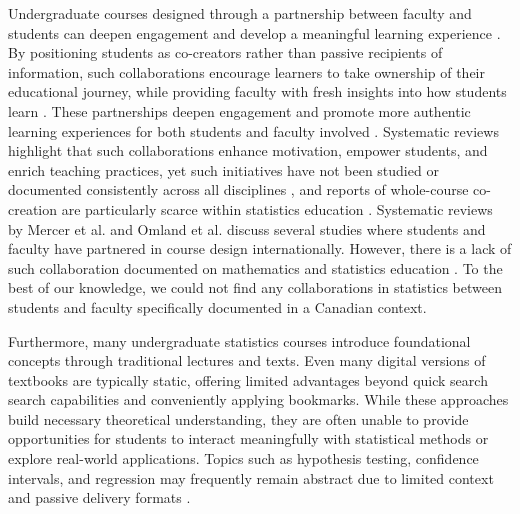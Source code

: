 \documentclass[11pt]{article}
\begin{document}
Undergraduate courses designed through a partnership between faculty and students can deepen engagement and develop a meaningful learning experience \cite{Healey2016} \cite{Bovill2019}. 
By positioning students as co-creators rather than passive recipients of information, such collaborations encourage learners to take ownership of their educational journey, while providing faculty with fresh insights into how students learn \cite{Healey2016}.
These partnerships deepen engagement and promote more authentic learning experiences for both students and faculty involved \cite{Bengtson2013} \cite{Healey2016}.
Systematic reviews highlight that such collaborations enhance motivation, empower students, and enrich teaching practices, yet such initiatives have not been studied or documented consistently across all disciplines \cite{Bovill2019} \cite{MercerMapstone2017}, and reports of whole-course co-creation are particularly scarce within statistics education \cite{Kim2022}. 
Systematic reviews by Mercer et al. \cite{MercerMapstone2017} and Omland et al. \cite{Omland2025} discuss several studies where students and faculty have partnered in course design internationally. However, there is a lack of such collaboration documented on mathematics and statistics education \cite{Duah2011}.
To the best of our knowledge, we could not find any collaborations in statistics between students and faculty specifically documented in a Canadian context.

Furthermore, many undergraduate statistics courses introduce foundational concepts through traditional lectures and texts. 
Even many digital versions of textbooks are typically static, offering limited advantages beyond quick search search capabilities and conveniently applying bookmarks.
While these approaches build necessary theoretical understanding, they are often unable to provide opportunities for students to interact meaningfully with statistical methods or explore real-world applications. 
Topics such as hypothesis testing, confidence intervals, and regression may frequently remain abstract due to limited context and passive delivery formats \cite{Tintle2015}. 
\end{document}
